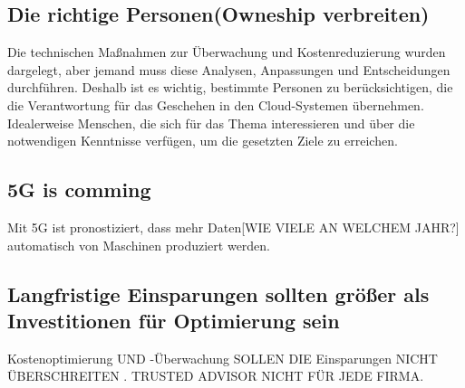 \subsection{Die richtige Personen(Owneship verbreiten)}
Die technischen Maßnahmen zur Überwachung und Kostenreduzierung wurden dargelegt, aber jemand muss diese Analysen, Anpassungen und Entscheidungen durchführen. 
Deshalb ist es wichtig, bestimmte Personen zu berücksichtigen, die die Verantwortung für das Geschehen in den Cloud-Systemen übernehmen. Idealerweise Menschen, die sich für das Thema interessieren und über die notwendigen Kenntnisse verfügen, um die gesetzten Ziele zu erreichen. 
\\
\subsection{5G is comming}
Mit 5G ist pronostiziert, dass mehr Daten[WIE VIELE AN WELCHEM JAHR?] automatisch von Maschinen produziert werden.
\\
\subsection{Langfristige Einsparungen sollten größer als Investitionen für Optimierung sein}
Kostenoptimierung UND -Überwachung SOLLEN DIE Einsparungen NICHT ÜBERSCHREITEN . 
TRUSTED ADVISOR NICHT FÜR JEDE FIRMA.
\begin{comment}
Von Buch "Gestaltung"
  Schluss (Fazit)
Den Abschluss der Arbeit bildet die Zusammenfassung der wesentlichen
Ergebnisse, die folgende drei Punkte beinhaltet:
Beantwortung der Forschungsfrage, die Sie in der Einleitung
aufgeworfen haben.
Sinnstiftung der Arbeit: Für welchen Zweck sollen die Ergebnisse
verwendet werden?
Gegebenenfalls auch persönliche Bemerkungen und Bewertungen oder
ein kurzer Ausblick.
\end{tcolorbox}

\end{comment}

